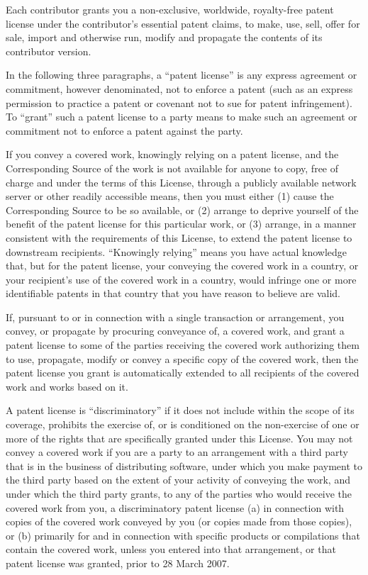 {\begin{multicols}{4}
Each contributor grants you a non-exclusive, worldwide, royalty-free patent license under the contributor's essential patent claims, to make, use, sell, offer for sale, import and otherwise run, modify and propagate the contents of its contributor version.

In the following three paragraphs, a “patent license” is any express agreement or commitment, however denominated, not to enforce a patent (such as an express permission to practice a patent or covenant not to sue for patent infringement). To “grant” such a patent license to a party means to make such an agreement or commitment not to enforce a patent against the party.

If you convey a covered work, knowingly relying on a patent license, and the Corresponding Source of the work is not available for anyone to copy, free of charge and under the terms of this License, through a publicly available network server or other readily accessible means, then you must either (1) cause the Corresponding Source to be so available, or (2) arrange to deprive yourself of the benefit of the patent license for this particular work, or (3) arrange, in a manner consistent with the requirements of this License, to extend the patent license to downstream recipients. “Knowingly relying” means you have actual knowledge that, but for the patent license, your conveying the covered work in a country, or your recipient's use of the covered work in a country, would infringe one or more identifiable patents in that country that you have reason to believe are valid.

If, pursuant to or in connection with a single transaction or arrangement, you convey, or propagate by procuring conveyance of, a covered work, and grant a patent license to some of the parties receiving the covered work authorizing them to use, propagate, modify or convey a specific copy of the covered work, then the patent license you grant is automatically extended to all recipients of the covered work and works based on it.

A patent license is “discriminatory” if it does not include within the scope of its coverage, prohibits the exercise of, or is conditioned on the non-exercise of one or more of the rights that are specifically granted under this License. You may not convey a covered work if you are a party to an arrangement with a third party that is in the business of distributing software, under which you make payment to the third party based on the extent of your activity of conveying the work, and under which the third party grants, to any of the parties who would receive the covered work from you, a discriminatory patent license (a) in connection with copies of the covered work conveyed by you (or copies made from those copies), or (b) primarily for and in connection with specific products or compilations that contain the covered work, unless you entered into that arrangement, or that patent license was granted, prior to 28 March 2007.


\end{multicols}}
